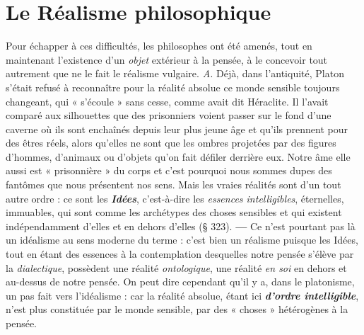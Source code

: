 \section{Le Réalisme philosophique}%
Pour échapper à ces
difficultés, les philosophes ont été amenés, tout en maintenant l’existence
d’un {\it objet} extérieur à la pensée, à le concevoir tout autrement
que ne le fait le réalisme vulgaire. {\it A.} Déjà, dans l’antiquité, Platon
s’était refusé à reconnaître pour la réalité absolue ce monde sensible
toujours changeant, qui « s'écoule » sans cesse, comme avait dit
Héraclite. Il l’avait comparé aux silhouettes que des prisonniers
voient passer sur le fond d’une caverne où ils sont enchaînés depuis
leur plus jeune âge et qu’ils prennent pour des êtres réels, alors
qu’elles ne sont que les ombres projetées par des figures d'hommes,
d’animaux ou d'objets qu’on fait défiler derrière eux. Notre âme
elle aussi est « prisonnière » du corps et c’est pourquoi nous sommes
dupes des fantômes que nous présentent nos sens. Mais les vraies
réalités sont d’un tout autre ordre : ce sont les \textbf{\textit {Idées}}, c’est-à-dire les
{\it essences intelligibles}, éternelles, immuables, qui sont comme les archétypes
des choses sensibles et qui existent indépendamment d’elles et
en dehors d’elles (§ 323). {\bf —} Ce n’est pourtant pas là un idéalisme au
sens moderne du terme : c’est bien un réalisme puisque les Idées,
tout en étant des essences à la contemplation desquelles notre pensée
s'élève par la {\it dialectique}, possèdent une réalité {\it ontologique}, une
réalité {\it en soi} en dehors et au-dessus de notre pensée. On peut dire
cependant qu'il y a, dans le platonisme, un pas fait vers l’idéalisme :
car la réalité absolue, étant ici \textbf{\textit {d'ordre intelligible}}, n'est plus constituée
par le monde sensible, par des « choses » hétérogènes à la pensée.

